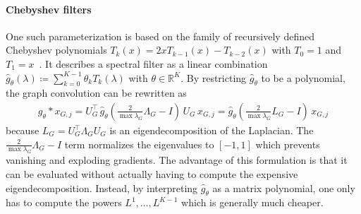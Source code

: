 \paragraph{Chebyshev filters}
One such parameterization is based on the family of recursively defined Chebyshev polynomials $T_k(x) = 2x T_{k-1}(x) - T_{k-2}(x)$ with $T_0 = 1$ and $T_1 = x$~\cite{Defferrard2016}.
It describes a spectral filter as a linear combination $\hat{g}_{\theta}(\lambda) \coloneqq \sum_{k=0}^{K-1} \theta_k T_k(\lambda)$ with $\theta \in \mathbb{R}^K$.
By restricting $\hat{g}_{\theta}$ to be a polynomial, the graph convolution can be rewritten as
\begin{align}
	g_{\theta} * x_{G,j} = U_G^{\top}\, \hat{g}_{\theta}(\tfrac{2}{\max \lambda_{G}} \Lambda_G - I)\, U_G\, x_{G,j} = \hat{g}_{\theta}(\tfrac{2}{\max \lambda_{G}} L_G - I)\, x_{G,j} %
\end{align}
because $L_G = U_G^{\top} \Lambda_G U_G$ is an eigendecomposition of the Laplacian.
The $\tfrac{2}{\max \lambda_{G}} \Lambda_G - I$ term normalizes the eigenvalues to $[-1, 1]$ which prevents vanishing and exploding gradients.
The advantage of this formulation is that it can be evaluated without actually having to compute the expensive eigendecomposition.
Instead, by interpreting $\hat{g}_{\theta}$ as a matrix polynomial, one only has to compute the powers $L^1, \dots, L^{K-1}$ which is generally much cheaper.

